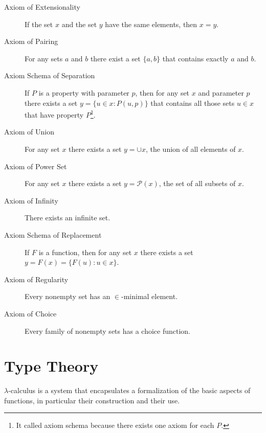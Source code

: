 \begin{description}

\item[Axiom of Extensionality] If the set $x$ and the set $y$ have the same elements, then $x=y$.

\item[Axiom of Pairing] For any sets $a$ and $b$ there exist a set $\{a, b\}$ that contains exactly $a$ and $b$.

\item[Axiom Schema of Separation] If $P$ is a property with parameter $p$, then for any set $x$ and parameter $p$ there exists a set $y=\{u \in x : P(u,p) \}$ that contains all those sets $u \in x$ that have property $P$\footnote{It called axiom schema because there exists one axiom for each $P$.}.

\item[Axiom of Union] For any set $x$ there exists a set $y = \cup x$, the union of all elements of $x$. 

\item[Axiom of Power Set] For any set $x$ there exists a set $y = \mathcal{P}(x)$, the set of all subsets of $x$.

\item[Axiom of Infinity] There exists an infinite set.

\item[Axiom Schema of Replacement] If $F$ is a function, then for any set $x$ there exists a set $y = F(x) = \{F(u) : u \in x \}$. 

\item[Axiom of Regularity] Every nonempty set has an $\in$-minimal element.

\item[Axiom of Choice] Every family of nonempty sets has a choice function.

\end{description}


%
%

\section{Type Theory}

{\color{red}

$\lambda$-calculus is a system that encapsulates a formalization of the basic aspects of functions, in particular their construction and their use.

}

